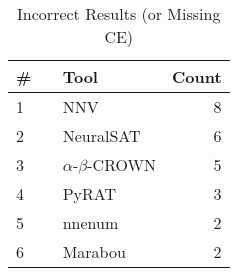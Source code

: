 
\begin{table}[h]
\begin{center}
\caption{Incorrect Results (or Missing CE)} \label{tab:stats4}
{\setlength{\tabcolsep}{2pt}
\begin{tabular}[h]{@{}llr@{}}
\toprule
\textbf{\# ~} & \textbf{Tool} & \textbf{Count}\\
\midrule
1 & NNV & 8 \\
2 & NeuralSAT & 6 \\
3 & $\alpha$-$\beta$-CROWN & 5 \\
4 & PyRAT & 3 \\
5 & nnenum & 2 \\
6 & Marabou & 2 \\
\bottomrule
\end{tabular}
}
\end{center}
\end{table}


